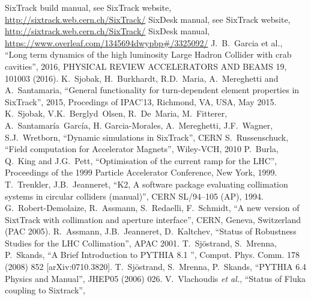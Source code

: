 \begin{thebibliography}{99}
        SixTrack build manual, see SixTrack website, \url{http://sixtrack.web.cern.ch/SixTrack/}
        SixDesk manual, see SixTrack website, \url{http://sixtrack.web.cern.ch/SixTrack/}
        SixDesk manual, \url{https://www.overleaf.com/1345694dwypbp#/3325092/}
        J.~B.~Garcia et al.,
        ``Long term dynamics of the high luminosity Large Hadron Collider with crab cavities'',
        2016, PHYSICAL REVIEW ACCELERATORS AND BEAMS 19, 101003 (2016).
        K.~Sjobak, H.~Burkhardt, R.D.~Maria, A.~Mereghetti and A.~Santamaria,
        ``General functionality for turn-dependent element properties in SixTrack'',
        2015, Procedings of IPAC'13, Richmond, VA, USA, May 2015.
        K.~Sjobak, V.K.~Berglyd~Olsen, R.~De~Maria, M.~Fitterer, A.~Santamaría~García, H. Garcia-Morales, A.~Mereghetti, J.F.~Wagner, S.J.~Wretborn,
        ``Dynamic simulations in SixTrack'',
        CERN
        S.~Russenschuck,
        ``Field computation for Accelerator Magnets'',
        Wiley-VCH, 2010
        P.~Burla, Q.~King and J.G.~Pett,
        ``Optimisation of the current ramp for the LHC'',
        Proceedings of the 1999 Particle Accelerator Conference, New York, 1999.
        T.~Trenkler, J.B.~Jeanneret,
        ``K2, A software package evaluating collimation systems in circular colliders (manual)'',
        CERN SL/94–105 (AP), 1994.
        G.~Robert-Demolaize, R.~Assmann, S.~Redaelli, F.~Schmidt,
        ``A new version of SixtTrack with collimation and aperture interface'',
        CERN, Geneva, Switzerland (PAC 2005).
        R.~Assmann, J.B.~Jeanneret, D.~Kaltchev,
        ``Status of Robustness Studies for the LHC Collimation'',
        APAC 2001.
        T.~Sjöstrand, S.~Mrenna, P.~Skands,
        ``A Brief Introduction to PYTHIA 8.1 '',
        Comput. Phys. Comm. 178 (2008) 852 [arXiv:0710.3820].
        T.~Sjöstrand, S.~Mrenna, P.~Skands,
        ``PYTHIA 6.4 Physics and Manual'',
        JHEP05 (2006) 026.
        V.~Vlachoudis {\it et al.}, ``Status of Fluka coupling to Sixtrack'',

\end{thebibliography}
